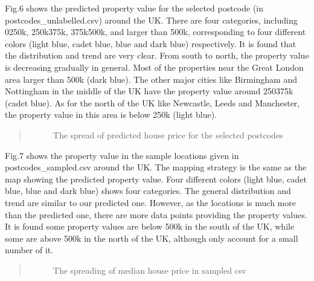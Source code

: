 \documentclass[letterpaper,10pt,english]{sphinxmanual}
\let\sphinxpxdimen\pdfpxdimen\else\newdimen\sphinxpxdimen
\begin{document}
\sphinxAtStartPar
Fig.6 shows the predicted property value for the selected postcode (in postcodes\_unlabelled.csv) around the UK. There are four categories, including 0\sphinxhyphen{}250k, 250k\sphinxhyphen{}375k, 375k\sphinxhyphen{}500k, and larger than 500k, corresponding to four different colors (light blue, cadet blue, blue and dark blue) respectively. It is found that the distribution and trend are very clear. From south to north, the property value is decreasing gradually in general. Most of the properties near the Great London area larger than 500k (dark blue). The other major cities like Birmingham and Nottingham in the middle of the UK have the property value around 250\sphinxhyphen{}375k (cadet blue). As for the north of the UK like Newcastle, Leeds and Manchester, the property value in this area is below 250k (light blue).
\begin{quote}

\begin{figure}[htbp]
\centering
\capstart

\noindent\sphinxincludegraphics[width=500\sphinxpxdimen]{{pic6}.png}
\caption{The spread of predicted house price for the selected postcodes}\label{\detokenize{index:id12}}\end{figure}
\end{quote}

\sphinxAtStartPar
Fig.7 shows the property value in the sample locations given in postcodes\_sampled.csv around the UK. The mapping strategy is the same as the map showing the predicted property value. Four different colors (light blue, cadet blue, blue and dark blue) shows four categories. The general distribution and trend are similar to our predicted one. However, as the locations is much more than the predicted one, there are more data points providing the property values. It is found some property values are below 500k in the south of the UK, while some are above 500k in the north of the UK, although only account for a small number of it.
\begin{quote}

\begin{figure}[htbp]
\centering
\capstart

\noindent\sphinxincludegraphics[width=500\sphinxpxdimen]{{pic7}.png}
\caption{The spreading of median house price in sampled csv}\label{\detokenize{index:id13}}\end{figure}
\end{quote}
\end{document}
